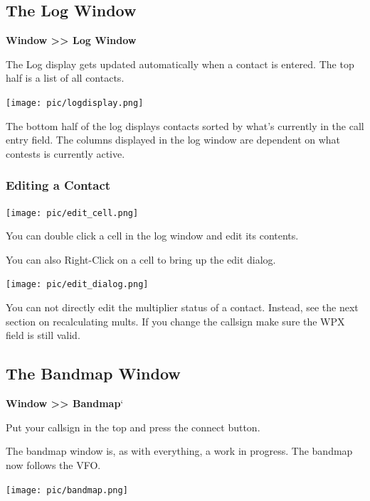 \documentclass{article}
\begin{document}
\subsection{The Log Window}

\textbf{Window >> Log Window}

The Log display gets updated automatically when a contact is entered. The top half is a list of all contacts.

\vspace{0.5cm}
\texttt{[image: pic/logdisplay.png]}
\vspace{0.5cm}

The bottom half of the log displays contacts sorted by what's currently in the call entry field. The columns displayed in the log window are dependent on what contests is currently active.

\subsubsection{Editing a Contact}

\vspace{0.5cm}
\texttt{[image: pic/edit\_cell.png]}
\vspace{0.5cm}

You can double click a cell in the log window and edit its contents.

You can also Right-Click on a cell to bring up the edit dialog.

\vspace{0.5cm}
\texttt{[image: pic/edit\_dialog.png]}
\vspace{0.5cm}

You can not directly edit the multiplier status of a contact. Instead, see the next section on recalculating mults. If you change the callsign make sure the WPX field is still valid.

\newpage

\subsection{The Bandmap Window}

\textbf{Window >> Bandmap}`

Put your callsign in the top and press the connect button.

The bandmap window is, as with everything, a work in progress. The bandmap now follows the VFO.

\vspace{0.5cm}
\texttt{[image: pic/bandmap.png]}
\vspace{0.5cm}
\end{document}
